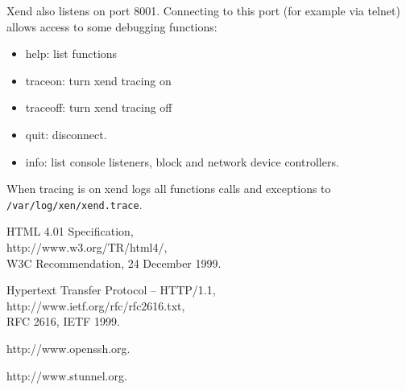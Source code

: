 \documentclass[11pt,twoside,final,openright]{report}
\begin{document}
Xend also listens on port 8001. Connecting to this port (for example via telnet)
allows access to some debugging functions:
\begin{itemize}
\item help: list functions
\item traceon: turn xend tracing on
\item traceoff: turn xend tracing off
\item quit: disconnect.
\item info: list console listeners, block and network device controllers.
\end{itemize}

When tracing is on xend logs all functions calls and exceptions to
{\tt /var/log/xen/xend.trace}.

\begin{thebibliography}{99}

HTML 4.01 Specification,\\
http://www.w3.org/TR/html4/,\\
W3C Recommendation, 24 December 1999.

Hypertext Transfer Protocol -- HTTP/1.1,\\
http://www.ietf.org/rfc/rfc2616.txt,\\
RFC 2616, IETF 1999.

http://www.openssh.org.

http://www.stunnel.org.

\end{thebibliography}
\end{document}
